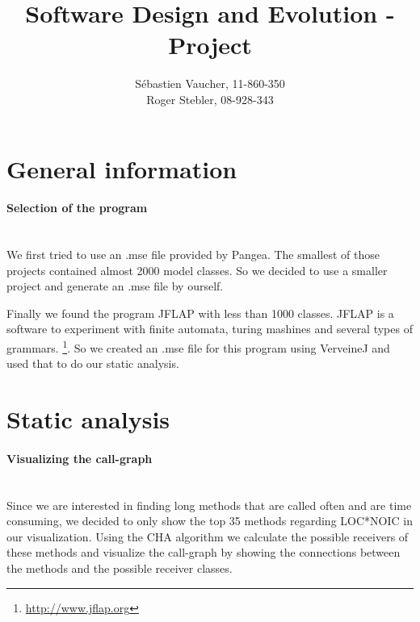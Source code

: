 \documentclass{paper}
\title{Software Design and Evolution - Project}
\author{S\'{e}bastien Vaucher, 11-860-350\\Roger Stebler, 08-928-343}
\begin{document}
\maketitle


%

\section{General information}

\paragraph{Selection of the program}\mbox{}\vspace{10pt}\\
We first tried to use an .mse file provided by Pangea. The smallest of those projects contained almost 2000 model classes. So we decided to use a smaller project and generate an .mse file by ourself.


Finally we found the program JFLAP with less than 1000 classes. JFLAP is a software to experiment with finite automata, turing mashines and several types of grammars. \footnote{\url{http://www.jflap.org}}. So we created an .mse file for this program using VerveineJ and used that to do our static analysis.


\section{Static analysis}

\paragraph{Visualizing the call-graph}\mbox{}\vspace{10pt}\\
Since we are interested in finding long methods that are called often and are time consuming, we decided to only show the top 35 methods regarding LOC*NOIC in our visualization. Using the CHA algorithm we calculate the possible receivers of these methods and visualize the call-graph by showing the connections between the methods and the possible receiver classes.
\end{document}
